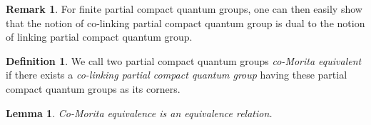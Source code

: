 \documentclass[11pt]{article}
\newtheorem{Lem}[Theorem]{Lemma}
\theoremstyle{definition}
\newtheorem{Def}[Theorem]{Definition}
\newtheorem{Rem}[Theorem]{Remark}
\numberwithin{equation}{section}
\begin{document}
\begin{Rem} For finite partial compact quantum groups, one can then easily show that the notion of co-linking partial compact quantum group is dual to the notion of linking partial compact quantum group.\end{Rem}

\begin{Def} We call two partial compact quantum groups \emph{co-Morita equivalent} if there exists a \emph{co-linking partial compact quantum group} having these partial compact quantum groups as its corners.
\end{Def}

\begin{Lem} Co-Morita equivalence is an equivalence relation. 
\end{Lem} 
\end{document}
